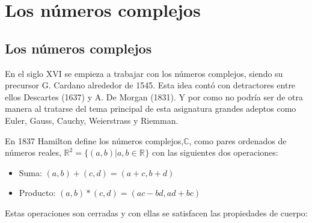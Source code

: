 \chapter{Los números complejos}

\section{Los números complejos}
En el siglo XVI se empieza a trabajar con los números complejos, siendo su precursor G. Cardano alrededor de 1545.
Esta idea contó con detractores entre ellos Descartes (1637) y A. De Morgan (1831).
Y por como no podría ser de otra manera al tratarse del tema principal de esta asignatura grandes adeptos como Euler, Gauss, Cauchy, Weierstrass y Riemman.

En 1837 Hamilton define los números complejos,\(\mathbb{C}\), como pares ordenados de números reales, \(\mathbb{R}^{2}=\{(a,b) | a,b \in \mathbb{R}^{}\}\) con las siguientes dos operaciones:

\begin{itemize}
  \item Suma: \((a,b)+(c,d) = (a+c, b+d)\)
  \item Producto: \((a,b)*(c,d) = (ac-bd, ad+bc)\)
\end{itemize}

Estas operaciones son cerradas y con ellas se satisfacen las propiedades de cuerpo:

